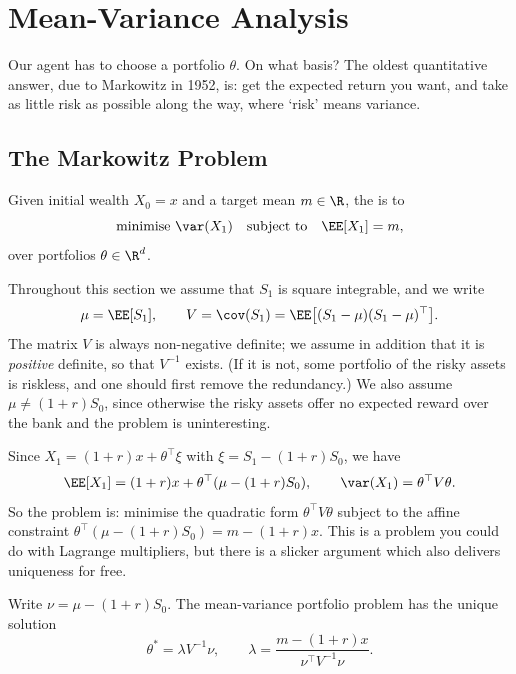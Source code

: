 \section{Mean-Variance Analysis}

Our agent has to choose a portfolio $\theta$. On what basis? The oldest quantitative answer, due to Markowitz in 1952, is: get the expected return you want, and take as little risk as possible along the way, where `risk' means variance.

\subsection{The Markowitz Problem}

\begin{definition}
	Given initial wealth $X_0 = x$ and a target mean $m \in \R$, the  is to
	$$
	\text{minimise } \var(X_1) \quad \text{subject to} \quad \EE[X_1] = m,
	$$
	over portfolios $\theta \in \R^d$.
\end{definition}

Throughout this section we assume that $S_1$ is square integrable, and we write
$$
\mu = \EE[S_1], \qquad V = \cov(S_1) = \EE\big[(S_1 - \mu)(S_1-\mu)^\top\big].
$$
The matrix $V$ is always non-negative definite; we assume in addition that it is \emph{positive} definite, so that $V^{-1}$ exists. (If it is not, some portfolio of the risky assets is riskless, and one should first remove the redundancy.) We also assume $\mu \neq (1+r)S_0$, since otherwise the risky assets offer no expected reward over the bank and the problem is uninteresting.

Since $X_1 = (1+r)x + \theta^\top \xi$ with $\xi = S_1 - (1+r)S_0$, we have
$$
\EE[X_1] = (1+r)x + \theta^\top(\mu - (1+r)S_0), \qquad \var(X_1) = \theta^\top V \theta.
$$
So the problem is: minimise the quadratic form $\theta^\top V\theta$ subject to the affine constraint $\theta^\top(\mu - (1+r)S_0) = m - (1+r)x$. This is a problem you could do with Lagrange multipliers, but there is a slicker argument which also delivers uniqueness for free.

\begin{theorem}[Markowitz]\label{thm:markowitz}
	Write $\nu = \mu - (1+r)S_0$. The mean-variance portfolio problem has the unique solution
	$$
	\theta^* = \lambda V^{-1}\nu, \qquad \lambda = \frac{m - (1+r)x}{\nu^\top V^{-1}\nu}.
	$$
\end{theorem}

